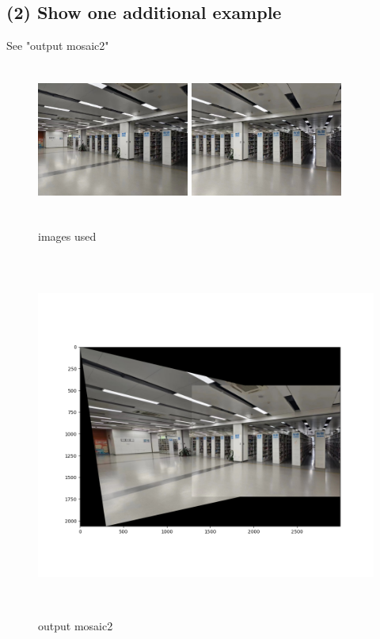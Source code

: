 \documentclass[a4paper,UTF8]{article}
\numberwithin{equation}{section}
\begin{document}
\subsection*{(2) Show one additional example}
See "output mosaic2"
\begin{figure}[H]
	\centering  %
	\includegraphics[width=5cm,height=5cm]{img1.jpg}  %
	\includegraphics[width=5cm,height=5cm]{img2.jpg}  %
	\caption{images used}  %
\end{figure}
\begin{figure}[H]
	\centering  %
	\includegraphics[width=12cm,height=12cm]{result2.png}  %
	\caption{output mosaic2}  %
\end{figure}
\end{document}
